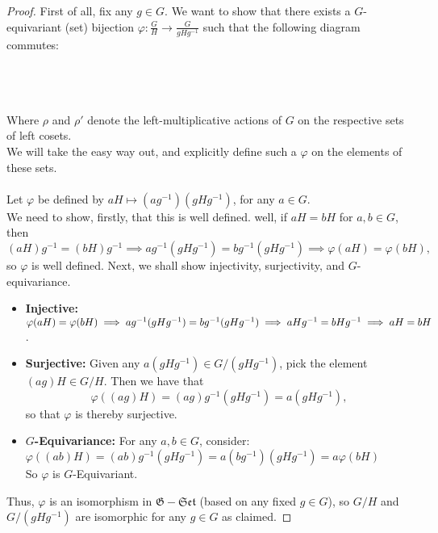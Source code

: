 \documentclass[12pt,letterpaper]{article}
\newcommand{\invamalg}{\mathbin{\text{\rotatebox[origin=c]{180}{$\amalg$}}}}
\begin{document}
\begin{proof}
	First of all, fix any $g \in G$.
	We want to show that there exists a $G$-equivariant (set) bijection $\varphi: \frac{G}{H} \rightarrow \frac{G}{gHg^{-1}}$ such that the following diagram commutes:\\\\
	\\\\
		Where $\rho$ and $\rho'$ denote the left-multiplicative actions of $G$ on the respective sets of left cosets.\\
		We will take the easy way out, and explicitly define such a $\varphi$ on the elements of these sets.\\\\ 
		Let $\varphi$ be defined by $aH \mapsto (ag^{-1})(gHg^{-1})$, for any $a\in G$.\\
		We need to show, firstly, that this is well defined. well, if $aH = bH$ for $a,b\in G$, then
		\[
			(aH)g^{-1} = (bH)g^{-1} \implies ag^{-1}(gHg^{-1}) = bg^{-1}(gHg^{-1}) \implies \varphi(aH) = \varphi(bH),
		\]
		so $\varphi$ is well defined. Next, we shall show injectivity, surjectivity, and $G$-equivariance.
		\begin{itemize}
			\item\textbf{Injective:}\\ 
				$\varphi(aH) = \varphi(bH) \implies ag^{-1}(gHg^{-1}) = bg^{-1}(gHg^{-1})\\ 
				\implies aHg^{-1} = bHg^{-1} \implies aH = bH$.
			\item\textbf{Surjective:} Given any $a(gHg^{-1}) \in G / (gHg^{-1})$, pick the element $(ag)H \in G/H$. Then we have that
			\[
				\varphi((ag)H) = (ag)g^{-1}(gHg^{-1}) = a(gHg^{-1}),
			\]
			so that $\varphi$ is thereby surjective.
			\item\textbf{$G$-Equivariance:} For any $a,b \in G$, consider:\\ 
			$\varphi((ab)H) = (ab)g^{-1}(gHg^{-1}) = a(bg^{-1})(gHg^{-1}) = a\varphi(bH)$\\
			So $\varphi$ is $G$-Equivariant.
		\end{itemize}
		Thus, $\varphi$ is an isomorphism in $\mathfrak{G-Set}$ (based on any fixed $g\in G$), so $G/H$ and $G/(gHg^{-1})$ are isomorphic for any $g \in G$ as claimed.
\end{proof}
\end{document}
